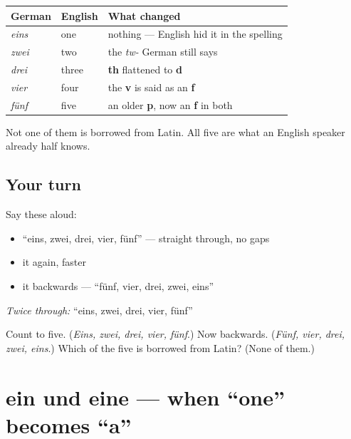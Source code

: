 \noindent
\begin{tabularx}{\linewidth}{@{}>{\raggedright\arraybackslash}X>{\raggedright\arraybackslash}X>{\raggedright\arraybackslash}X@{}}
\toprule
\textbf{German} & \textbf{English} & \textbf{What changed} \\
\midrule
\emph{eins} & one & nothing — English hid it in the spelling \\
\emph{zwei} & two & the \emph{tw-} German still says \\
\emph{drei} & three & \textbf{th} flattened to \textbf{d} \\
\emph{vier} & four & the \textbf{v} is said as an \textbf{f} \\
\emph{fünf} & five & an older \textbf{p}, now an \textbf{f} in both \\
\bottomrule
\end{tabularx}

Not one of them is borrowed from Latin. All five are what an English speaker already half knows.

\subsection*{Your turn}
Say these aloud:

\begin{itemize}
\raggedright
  \item \textquotedblleft{}eins, zwei, drei, vier, fünf\textquotedblright{} — straight through, no gaps
  \item it again, faster
  \item it backwards — \textquotedblleft{}fünf, vier, drei, zwei, eins\textquotedblright{}
\end{itemize}

\emph{Twice through:} \textquotedblleft{}eins, zwei, drei, vier, fünf\textquotedblright{}

\begin{tcolorbox}[breakable,colback=teal!4,colframe=teal!35!black,title={Before you move on}]
Count to five. (\emph{Eins, zwei, drei, vier, fünf}.) Now backwards. (\emph{Fünf, vier, drei, zwei, eins}.) Which of the five is borrowed from Latin? (None of them.)
\end{tcolorbox}
\section[ein / eine]{ein und eine — when \textquotedblleft{}one\textquotedblright{} becomes \textquotedblleft{}a\textquotedblright{}}

